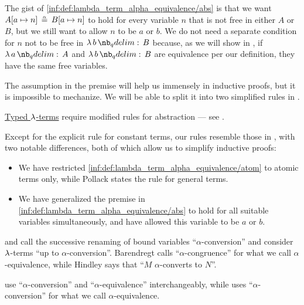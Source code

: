 \begin{comments}
  \item The gist of \ref{inf:def:lambda_term_alpha_equivalence/abs} is that we want \( A[a \mapsto n] \aequiv B[a \mapsto n] \) to hold for every variable \( n \) that is not free in either \( A \) or \( B \), but we still want to allow \( n \) to be \( a \) or \( b \). We do not need a separate condition for \( n \) not to be free in \( \qabs b B \) because, as we will show in , if \( \qabs a A \) and \( \qabs b B \) are equivalence per our definition, they have the same free variables.

  The assumption in the premise will help us immensely in inductive proofs, but it is impossible to mechanize. We will be able to split it into two simplified rules in .

  \item \hyperref[def:typed_lambda_term]{Typed \( \mathrm{\lambda} \)-terms} require modified rules for abstraction --- see .

  \item Except for the explicit rule for constant terms, our rules resemble those in \cite[5]{Pollack2005AlphaConversion}, with two notable differences, both of which allow us to simplify inductive proofs:
  \begin{itemize}
    \item We have restricted \ref{inf:def:lambda_term_alpha_equivalence/atom} to atomic terms only, while Pollack states the rule for general terms.
    \item We have generalized the premise in \ref{inf:def:lambda_term_alpha_equivalence/abs} to hold for all suitable variables simultaneously, and have allowed this variable to be \( a \) or \( b \).
  \end{itemize}

  \item {} and  call the successive renaming of bound variables \enquote{\( \alpha \)-conversion} and consider \( \mathrm{\lambda} \)-terms \enquote{up to \( \alpha \)-conversion}. Barendregt calls \enquote{\( \alpha \)-congruence} for what we call \( \alpha \)-equivalence, while Hindley says that \enquote{\( M \) \( \alpha \)-converts to \( N \)}.

   use \enquote{\( \alpha \)-conversion} and \enquote{\( \alpha \)-equivalence} interchangeably, while  uses \enquote{\( \alpha \)-conversion} for what we call \( \alpha \)-equivalence.


\end{comments}
